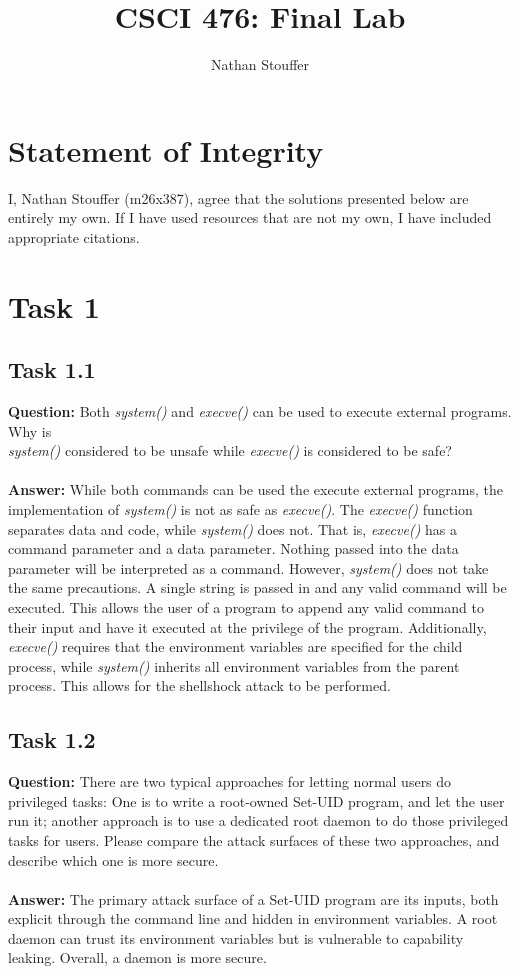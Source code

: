 \documentclass[11pt]{article}
\newcommand{\sys}{\textit{system()} }
\newcommand{\exec}{\textit{execve()} }
\begin{document}
\title{CSCI 476: Final Lab}
\author{Nathan Stouffer}
\maketitle
\newpage

\section*{Statement of Integrity}
I, Nathan Stouffer (m26x387), agree that the solutions presented below are entirely my own. If I have used resources that are not my own, I have included appropriate citations.

\section*{Task 1}

\subsection*{Task 1.1}

\textbf{Question: } Both \textit{system()} and \textit{execve()} can be used to execute external programs. Why is \\ \textit{system()} considered to be unsafe while \textit{execve()} is considered to be safe? \\\\
\textbf{Answer: } While both commands can be used the execute external programs, the implementation of \textit{system()} is not as safe as \textit{execve()}. The \textit{execve()} function separates data and code, while \sys does not. That is, \exec has a command parameter and a data parameter. Nothing passed into the data parameter will be interpreted as a command. However, \sys does not take the same precautions. A single string is passed in and any valid command will be executed. This allows the user of a program to append any valid command to their input and have it executed at the privilege of the program. Additionally, \exec requires that the environment variables are specified for the child process, while \sys inherits all environment variables from the parent process. This allows for the shellshock attack to be performed.

\subsection*{Task 1.2}

\textbf{Question: } There are two typical approaches for letting normal users do privileged tasks: One is to write a root-owned Set-UID program, and let the user run it; another approach is to use a dedicated root daemon to do those privileged tasks for users. Please compare the attack surfaces of these two approaches, and describe which one is more secure. \\\\
\textbf{Answer: } The primary attack surface of a Set-UID program are its inputs, both explicit through the command line and hidden in environment variables. A root daemon can trust its environment variables but is vulnerable to capability leaking. Overall, a daemon is more secure.
\end{document}
